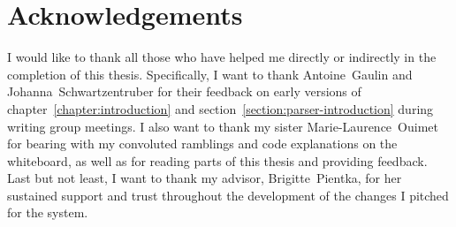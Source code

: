 \chapter*{Acknowledgements}\label{chapter:acknowledgments}

I would like to thank all those who have helped me directly or indirectly in the completion of this thesis.
Specifically, I want to thank Antoine~Gaulin and Johanna~Schwartzentruber for their feedback on early versions of chapter~\ref{chapter:introduction} and section~\ref{section:parser-introduction} during writing group meetings.
I also want to thank my sister Marie-Laurence~Ouimet for bearing with my convoluted ramblings and code explanations on the whiteboard, as well as for reading parts of this thesis and providing feedback.
Last but not least, I want to thank my advisor, Brigitte~Pientka, for her sustained support and trust throughout the development of the changes I pitched for the \Beluga system.

